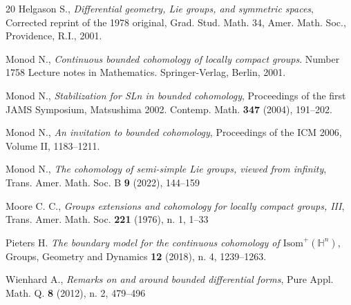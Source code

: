 \documentclass[a4paper]{amsart}
\theoremstyle{definition}
\theoremstyle{remark}
\theoremstyle{TheoremNum}
\begin{document}
\begin{thebibliography}{20}
 Helgason S., \emph{Differential geometry, Lie groups, and symmetric spaces}, Corrected reprint
of the 1978 original, Grad. Stud. Math. 34, Amer. Math. Soc., Providence, R.I., 2001.

 Monod N., \emph{Continuous bounded cohomology of locally compact groups}. Number 1758 
Lecture notes in Mathematics. Springer-Verlag, Berlin, 2001.

 Monod N., \emph{Stabilization for SLn in bounded cohomology}, Proceedings of the first JAMS
Symposium, Matsushima 2002. Contemp. Math. {\bf 347} (2004), 191--202.

 Monod N., \emph{An invitation to bounded cohomology}, Proceedings of the ICM 2006, Volume II, 1183--1211.

 Monod N., \emph{The cohomology of semi-simple Lie groups, viewed from infinity}, Trans. Amer. Math. Soc. B {\bf 9} (2022), 144--159 

 Moore C. C., \emph{Groups extensions and cohomology for locally compact groups, III}, Trans. Amer. Math. Soc. {\bf 221}
(1976), n. 1, 1--33

 Pieters H. \emph{The boundary model for the continuous cohomology of $\mathrm{Isom}^+(\mathbb{H}^n)$}, Groups, Geometry and Dynamics {\bf 12} (2018), n. 4, 1239--1263.

 Wienhard A.,
\emph{Remarks on and around bounded differential forms}, Pure Appl. Math. Q. {\bf 8} (2012), n. 2, 479--496






\end{thebibliography}
\end{document}
